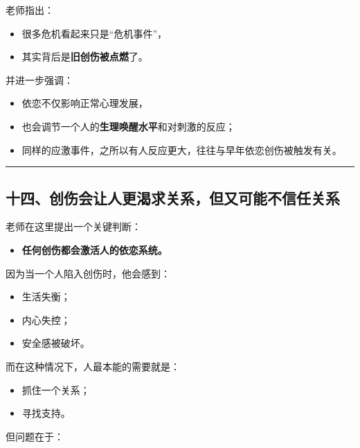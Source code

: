 \documentclass[
  chinese,
  9pt,
  a4paper,
]{ctexart}
\providecommand{\tightlist}{%
  \setlength{\itemsep}{0pt}\setlength{\parskip}{0pt}}
\begin{document}
老师指出：

\begin{itemize}
\tightlist
\item
  很多危机看起来只是``危机事件''，
\item
  其实背后是\textbf{旧创伤被点燃}了。
\end{itemize}

并进一步强调：

\begin{itemize}
\tightlist
\item
  依恋不仅影响正常心理发展，
\item
  也会调节一个人的\textbf{生理唤醒水平}和对刺激的反应；
\item
  同样的应激事件，之所以有人反应更大，往往与早年依恋创伤被触发有关。
\end{itemize}

\begin{center}\rule{0.5\linewidth}{0.5pt}\end{center}

\subsection{十四、创伤会让人更渴求关系，但又可能不信任关系}\label{ux5341ux56dbux521bux4f24ux4f1aux8ba9ux4ebaux66f4ux6e34ux6c42ux5173ux7cfbux4f46ux53c8ux53efux80fdux4e0dux4fe1ux4efbux5173ux7cfb}

老师在这里提出一个关键判断：

\begin{itemize}
\tightlist
\item
  \textbf{任何创伤都会激活人的依恋系统。}
\end{itemize}

因为当一个人陷入创伤时，他会感到：

\begin{itemize}
\tightlist
\item
  生活失衡；
\item
  内心失控；
\item
  安全感被破坏。
\end{itemize}

而在这种情况下，人最本能的需要就是：

\begin{itemize}
\tightlist
\item
  抓住一个关系；
\item
  寻找支持。
\end{itemize}

但问题在于：
\end{document}
